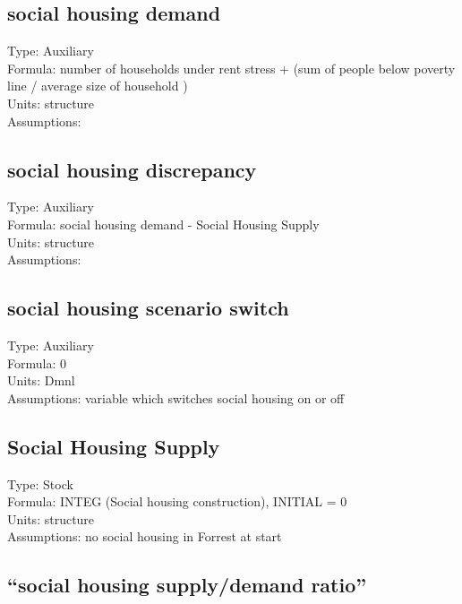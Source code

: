 \documentclass[
  11pt,
]{book}
\begin{document}
\hypertarget{social-housing-demand}{%
\subsection{social housing demand}\label{social-housing-demand}}

Type: Auxiliary\\
Formula: number of households under rent stress + (sum of people below poverty line / average size of household )\\
Units: structure\\
Assumptions:

\hypertarget{social-housing-discrepancy}{%
\subsection{social housing discrepancy}\label{social-housing-discrepancy}}

Type: Auxiliary\\
Formula: social housing demand - Social Housing Supply\\
Units: structure\\
Assumptions:

\hypertarget{social-housing-scenario-switch}{%
\subsection{social housing scenario switch}\label{social-housing-scenario-switch}}

Type: Auxiliary\\
Formula: 0\\
Units: Dmnl\\
Assumptions: variable which switches social housing on or off

\hypertarget{social-housing-supply}{%
\subsection{Social Housing Supply}\label{social-housing-supply}}

Type: Stock\\
Formula: INTEG (Social housing construction), INITIAL = 0\\
Units: structure\\
Assumptions: no social housing in Forrest at start

\hypertarget{social-housing-supplydemand-ratio}{%
\subsection{``social housing supply/demand ratio''}\label{social-housing-supplydemand-ratio}}
\end{document}
